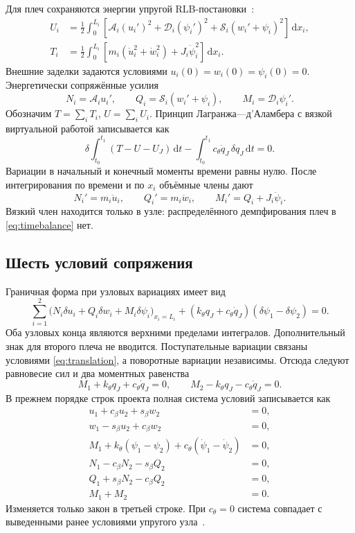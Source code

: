 \documentclass[11pt,a4paper]{article}
\numberwithin{equation}{section}
\newcommand{\dd}{\,\mathrm d}
\newcommand{\A}{\mathcal A}
\newcommand{\D}{\mathcal D}
\newcommand{\Sbeam}{\mathcal S}
\newcommand{\kth}{k_\theta}
\newcommand{\cth}{c_\theta}
\newcommand{\qJ}{q_J}
\begin{document}
Для плеч сохраняются энергии упругой RLB-постановки~\cite{projectjoint}:
\begin{align}
 U_i&=\frac12\int_0^{L_i}
 \left[\A_i(u_i')^2+\D_i(\psi_i')^2+
 \Sbeam_i(w_i'+\psi_i)^2\right]\dd x_i,\label{eq:U}\\
 T_i&=\frac12\int_0^{L_i}
 \left[m_i(\dot u_i^2+\dot w_i^2)+J_i\dot\psi_i^2\right]\dd x_i.
 \label{eq:T}
\end{align}
Внешние заделки задаются условиями $u_i(0)=w_i(0)=\psi_i(0)=0$.
Энергетически сопряжённые усилия
\begin{equation}
 N_i=\A_i u_i',\qquad
 Q_i=\Sbeam_i(w_i'+\psi_i),\qquad
 M_i=\D_i\psi_i'.
 \label{eq:constitutive}
\end{equation}
Обозначим $T=\sum_iT_i$, $U=\sum_iU_i$.
Принцип Лагранжа—д'Аламбера с вязкой виртуальной работой записывается как
\begin{equation}
 \delta\int_{t_0}^{t_1}(T-U-U_J)\dd t
 -\int_{t_0}^{t_1}\cth\dot\qJ\,\delta\qJ\dd t=0.
 \label{eq:dalembert}
\end{equation}
Вариации в начальный и конечный моменты времени равны нулю.
После интегрирования по времени и по $x_i$ объёмные члены дают
\begin{equation}
 \boxed{
 N_i'=m_i\ddot u_i,\qquad
 Q_i'=m_i\ddot w_i,\qquad
 M_i'=Q_i+J_i\ddot\psi_i.}
 \label{eq:timebalance}
\end{equation}
Вязкий член находится только в узле: распределённого демпфирования
плеч в \eqref{eq:timebalance} нет.

\subsection{Шесть условий сопряжения}

Граничная форма при узловых вариациях имеет вид
\begin{equation}
 \sum_{i=1}^2
 \bigl(N_i\delta u_i+Q_i\delta w_i+M_i\delta\psi_i\bigr)_{x_i=L_i}
 +(\kth\qJ+\cth\dot\qJ)(\delta\psi_1-\delta\psi_2)=0.
 \label{eq:boundaryvirtual}
\end{equation}
Оба узловых конца являются верхними пределами интегралов. Дополнительный
знак для второго плеча не вводится. Поступательные вариации связаны
условиями \eqref{eq:translation}, а поворотные вариации независимы.
Отсюда следуют равновесие сил и два моментных равенства
\[
 M_1+\kth\qJ+\cth\dot\qJ=0,
 \qquad
 M_2-\kth\qJ-\cth\dot\qJ=0.
\]
В прежнем порядке строк проекта полная система условий записывается как
\begin{equation}
 \boxed{\begin{aligned}
 u_1+c_\beta u_2+s_\beta w_2&=0,\\
 w_1-s_\beta u_2+c_\beta w_2&=0,\\
 M_1+\kth(\psi_1-\psi_2)+\cth(\dot\psi_1-\dot\psi_2)&=0,\\
 N_1-c_\beta N_2-s_\beta Q_2&=0,\\
 Q_1+s_\beta N_2-c_\beta Q_2&=0,\\
 M_1+M_2&=0.
 \end{aligned}}
 \label{eq:jointtime}
\end{equation}
Изменяется только закон в третьей строке. При $\cth=0$ система
совпадает с выведенными ранее условиями упругого узла~\cite{projectjoint}.
\end{document}
